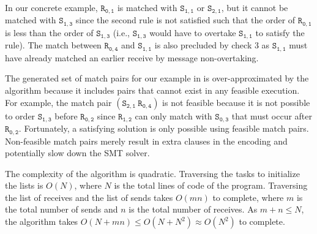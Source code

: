 In our concrete example, $\mathtt{R_{0,1}}$ is matched with
$\mathtt{S_{1,1}}$ or $\mathtt{S_{2,1}}$, but it cannot be matched
with $\mathtt{S_{1,3}}$ since the second rule is not satisfied such
that the order of $\mathtt{R_{0,1}}$ is less than the order of
$\mathtt{S_{1,3}}$ (i.e., $\mathtt{S_{1,3}}$ would have to overtake
$\mathtt{S_{1,1}}$ to satisfy the rule). The match between
$\mathtt{R_{0,4}}$ and $\mathtt{S_{1,1}}$ is also precluded by check 3
as $\mathtt{S_{1,1}}$ must have already matched an earlier receive by
message non-overtaking.

The generated set of match pairs for our example
in  is over-approximated by the algorithm because
it includes pairs that cannot exist in any feasible execution. For
example, the match pair $(\mathtt{S_{2,1}}\ \mathtt{R_{0,4}})$ is not
feasible because it is not possible to order $\mathtt{S_{1,3}}$ before
$\mathtt{R_{0,2}}$ since $\mathtt{R_{1,2}}$ can only match with
$\mathtt{S_{0,3}}$ that must occur after
$\mathtt{R_{0,2}}$. Fortunately, a satisfying solution is only
possible using feasible match pairs. Non-feasible match pairs
merely result in extra clauses in the encoding and potentially slow
down the SMT solver.

The complexity of the algorithm is quadratic. Traversing
the tasks to initialize the lists is $O(N)$, where $N$ is the total
lines of code of the program. Traversing the list of receives and the
list of sends takes $O(mn)$ to complete, where $m$ is the total number
of sends and $n$ is the total number of receives. As $m + n \le N$,
the algorithm takes $O(N + mn) \leq O(N + N^2) \approx O(N^2)$ to
complete.

